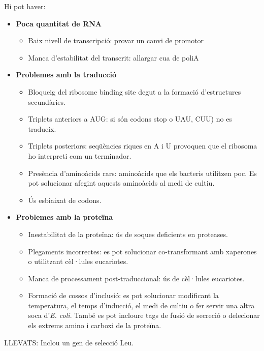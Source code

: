 Hi pot haver:
\begin{itemize}
\item \textbf{Poca quantitat de RNA}
  \begin{itemize}
  \item Baix nivell de transcripció: provar un canvi de promotor
  \item Manca d'estabilitat del transcrit: allargar cua de poliA
  \end{itemize}

\item \textbf{Problemes amb la traducció}
  \begin{itemize}
  \item Bloqueig del ribosome binding site degut a la formació d'estructures secundàries.
  \item Triplets anteriors a AUG: si són codons stop o UAU, CUU) no es tradueix.
  \item Triplets posteriors: seqüències riques en A i U provoquen que el ribosoma ho interpreti com un terminador.
  \item Presència d'aminoàcids rars: aminoàcids que els bacteris utilitzen poc. Es pot solucionar afegint aquests aminoàcids al medi de cultiu.
  \item Ús esbiaixat de codons.
  \end{itemize}

\item \textbf{Problemes amb la proteïna}
  \begin{itemize}
  \item Inestabilitat de la proteïna: ús de soques deficients en proteases.
  \item Plegaments incorrectes: es pot solucionar co-transformant amb xaperones o utilitzant cèl·lules eucariotes.
  \item Manca de processament post-traduccional: ús de cèl·lules eucariotes.
  \item Formació de cossos d'inclusió: es pot solucionar modificant la temperatura, el temps d'inducció, el medi de cultiu o fer servir una altra soca d'\textit{E. coli}. També es pot incloure tags de fusió de secreció o delecionar els extrems amino i carboxi de la proteïna.
  \end{itemize}
\end{itemize}

LLEVATS:
Inclou un gen de selecció Leu.